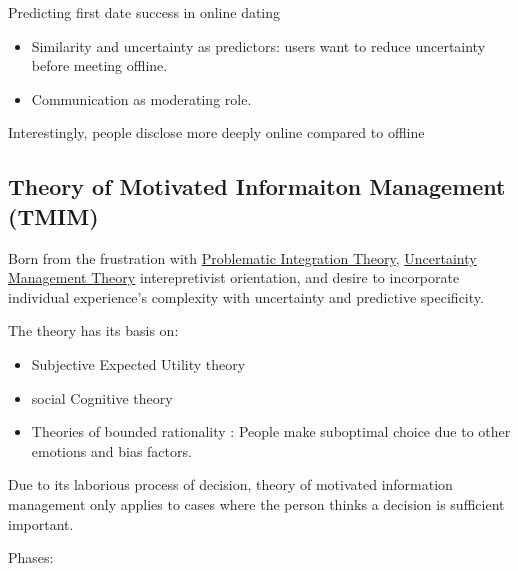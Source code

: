 \documentclass[
]{book}
\providecommand{\tightlist}{%
  \setlength{\itemsep}{0pt}\setlength{\parskip}{0pt}}
\begin{document}
Predicting first date success in online dating

\begin{itemize}
\tightlist
\item
  Similarity and uncertainty as predictors: users want to reduce uncertainty before meeting offline.\\
\item
  Communication as moderating role.
\end{itemize}

Interestingly, people disclose more deeply online compared to offline \citep{Tidwell_2002}

\hypertarget{theory-of-motivated-informaiton-management-tmim}{%
\subsection{Theory of Motivated Informaiton Management (TMIM)}\label{theory-of-motivated-informaiton-management-tmim}}

Born from the frustration with \protect\hyperlink{problematic-integration-theory}{Problematic Integration Theory}, \protect\hyperlink{uncertainty-management-theory}{Uncertainty Management Theory} interepretivist
orientation, and desire to incorporate individual experience's complexity with uncertainty and predictive specificity.

The theory has its basis on:

\begin{itemize}
\tightlist
\item
  Subjective Expected Utility theory \citep{Fischhoff_1983}\\
\item
  social Cognitive theory \citep{Locke_1987}
\item
  Theories of bounded rationality \citep{Kahneman_2003}: People make suboptimal choice due to other emotions and bias
  factors.
\end{itemize}

Due to its laborious process of decision, theory of motivated information management only applies to cases where the
person thinks a decision is sufficient important.

Phases:
\end{document}

